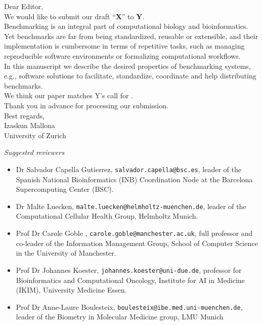\documentclass[a4paper]{article}
\newcommand{\submission}{X}
\newcommand{\journal}{Y}
\begin{document}
\noindent Dear Editor,\\

We would like to submit our draft ``\textbf{\submission}'' to \textbf{\journal}.\\

Benchmarking is an integral part of computational biology and bioinformatics. Yet benchmarks are far from being standardized, reusable or extensible, and their implementation is cumbersome in terms of repetitive tasks, such as managing reproducible software environments or formalizing computational workflows.\\ 

In this manuscript we describe the desired properties of benchmarking systems, e.g., software solutions to facilitate, standardize, coordinate and help distributing benchmarks.\\

We think our paper matches \journal's call for .\\

Thank you in advance for processing our submission. \\

Best regards,\\

Izaskun Mallona\\
\indent University of Zurich\\

\vspace{1cm}

\textit{Suggested reviewers}

\begin{itemize}
    \item Dr Salvador Capella Gutierrez, \texttt{salvador.capella@bsc.es}, leader of the Spanish National Bioinformatics (INB) Coordination Node at the Barcelona Supercomputing Center (BSC).
    \item Dr Malte Luecken, \texttt{malte.luecken@helmholtz-muenchen.de}, leader of the Computational Cellular Health Group, Helmholtz Munich.
    \item Prof Dr Carole Goble , \texttt{carole.goble@manchester.ac.uk}, full professor and co-leader of the Information Management Group, School of Computer Science in the University of Manchester.
    \item Prof Dr Johannes Koester, \texttt{johannes.koester@uni-due.de}, professor for Bioinformatics and Computational Oncology, Institute for AI in Medicine (IKIM), University Medicine Essen.
    \item Prof Dr Anne-Laure Boulesteix, \texttt{boulesteix@ibe.med.uni-muenchen.de}, leader of the Biometry in Molecular Medicine group, LMU Munich
\end{itemize}
\end{document}
